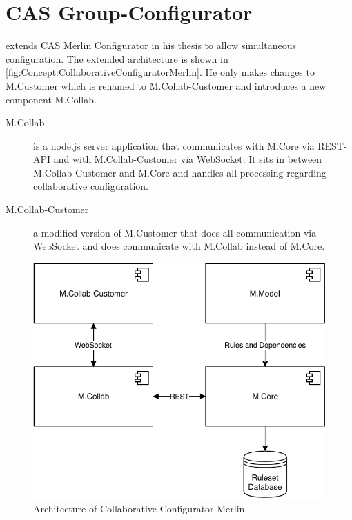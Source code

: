 \section{CAS Group-Configurator}
\label{sec:Concept:GroupConfigurator}

\citeauthor{raabKollaborativeProduktkonfigurationEchtzeit2019} extends CAS Merlin Configurator in his thesis to allow simultaneous configuration. The extended architecture is shown in \autoref{fig:Concept:CollaborativeConfiguratorMerlin}.
He only makes changes to M.Customer which is renamed to M.Collab-Customer and introduces a new component M.Collab.

\begin{description}
    \item[M.Collab] is a node.js server application that communicates with M.Core via REST-API and with M.Collab-Customer via WebSocket. It sits in between M.Collab-Customer and M.Core and handles all processing regarding collaborative configuration.
    \item[M.Collab-Customer] a modified version of M.Customer that does all communication via WebSocket and does communicate with M.Collab instead of M.Core.
\end{description}

\begin{figure}
    \centering
    \includegraphics{./figures/MerlinCollaborativeConfigurator.pdf}
    \caption{Architecture of Collaborative Configurator Merlin \cite[Fig. 4.3]{raabKollaborativeProduktkonfigurationEchtzeit2019}}
    \label{fig:Concept:CollaborativeConfiguratorMerlin}
\end{figure}


